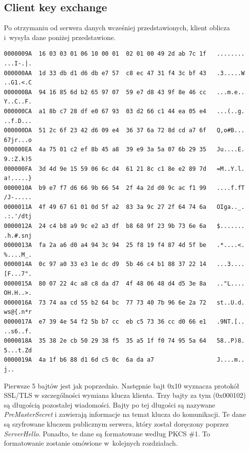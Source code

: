 \documentclass[12pt,twoside,a4]{mwbk}
\theoremstyle{definition}
\begin{document}
\subsection{Client key exchange}
Po otrzymaniu od serwera danych wcześniej przedstawionych, klient oblicza i~wysyła dane poniżej przedstawione.

\begin{lstlisting}[keywordstyle=\color{Black},
  commentstyle=\color{Black},
  stringstyle=\color{Black},
  identifierstyle=\color{Black}]
0000009A  16 03 03 01 06 10 00 01  02 01 00 49 2d ab 7c 1f   ........ ...I-.|.
000000AA  1d 33 db d1 d6 db e7 57  c8 ec 47 31 f4 3c bf 43   .3.....W ..G1.<.C
000000BA  94 16 85 6d b2 65 97 07  59 e7 d8 43 9f 8e 46 cc   ...m.e.. Y..C..F.
000000CA  a1 8b c7 28 df e0 67 93  03 d2 66 c1 44 ea 05 e4   ...(..g. ..f.D...
000000DA  51 2c 6f 23 42 d6 09 e4  36 37 6a 72 8d cd a7 6f   Q,o#B... 67jr...o
000000EA  4a 75 01 c2 ef 8b 45 a8  39 e9 3a 5a 07 6b 29 35   Ju....E. 9.:Z.k)5
000000FA  3d 4d 9e 15 59 06 6c d4  61 21 8c c1 8e e2 89 7d   =M..Y.l. a!.....}
0000010A  b9 e7 f7 d6 66 9b 66 54  2f 4a 2d d0 9c ac f1 99   ....f.fT /J-.....
0000011A  4f 49 67 61 01 0d 5f a2  83 3a 9c 27 2f 64 74 6a   OIga.._. .:.'/dtj
0000012A  24 c4 b8 a9 9c e2 a3 df  b8 68 9f 23 9b 73 6e 6a   $....... .h.#.snj
0000013A  fa 2a a6 d0 a4 94 3c 94  25 f8 19 f4 87 4d 5f be   .*....<. %....M_.
0000014A  0c 97 a0 33 e3 1e dc d9  5b 46 c4 b1 88 37 22 14   ...3.... [F...7".
0000015A  80 07 22 4c a8 c8 da d7  4f 48 06 48 d4 d5 3e 8a   .."L.... OH.H..>.
0000016A  73 74 aa cd 55 b2 64 bc  77 73 40 7b 96 6e 2a 72   st..U.d. ws@{.n*r
0000017A  e7 39 4e 54 f2 5b b7 cc  eb c5 73 36 cc d0 66 e1   .9NT.[.. ..s6..f.
0000018A  35 38 2e cb 50 29 38 f5  35 a5 1f f0 74 95 5a 64   58..P)8. 5...t.Zd
0000019A  4a 1f b6 88 d1 6d c5 0c  6a da a7                  J....m.. j..
\end{lstlisting}

Pierwsze 5 bajtów jest jak poprzednio. Następnie bajt 0x10 wyznacza protokół SSL/TLS w szczególności wymiana klucza klienta. Trzy bajty za tym (0x000102) są długością pozostałej wiadomości. Bajty po tej długości są nazywane \textit{PreMasterSecret} i zawierają informacje na temat klucza do komunikacji. Te dane są szyfrowane kluczem publicznym serwera, który został doręczony poprzez \textit{ServerHello}. Ponadto, te dane są formatowane według PKCS \#1. To formatowanie zostanie omówione w~kolejnych rozdziałach.
\end{document}
